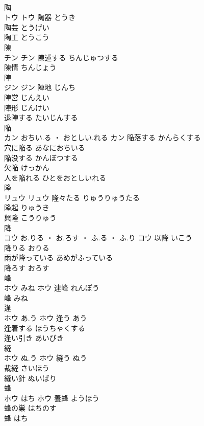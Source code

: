 \documentclass[8pt]{extreport}
\begin{document}
\begin{CJK}{UTF8}{min}
\\	陶	
\\	トウ		トウ	陶器	とうき	
\\	陶芸	とうげい	
\\	陶工	とうこう	
\\	陳	
\\	チン		チン	陳述する	ちんじゅつする	
\\	陳情	ちんじょう	
\\	陣	
\\	ジン		ジン	陣地	じんち	
\\	陣営	じんえい	
\\	陣形	じんけい	
\\	退陣する	たいじんする	
\\	陥	
\\	カン	おちい.る ・ おとしい.れる	カン	陥落する	かんらくする	
\\	穴に陥る	あなにおちいる	
\\	陥没する	かんぼつする	
\\	欠陥	けっかん	
\\	人を陥れる	ひとをおとしいれる	
\\	隆	
\\	リュウ		リュウ	隆々たる	りゅうりゅうたる	
\\	隆起	りゅうき	
\\	興隆	こうりゅう	
\\	降	
\\	コウ	お.りる ・ お.ろす ・ ふ.る ・ ふ.り	コウ	以降	いこう	
\\	降りる	おりる	
\\	雨が降っている	あめがふっている	
\\	降ろす	おろす	
\\	峰	
\\	ホウ	みね	ホウ	連峰	れんぽう	
\\	峰	みね	
\\	逢	
\\	ホウ	あ.う	ホウ	逢う	あう	
\\	逢着する	ほうちゃくする	
\\	逢い引き	あいびき	
\\	縫	
\\	ホウ	ぬ.う	ホウ	縫う	ぬう	
\\	裁縫	さいほう	
\\	縫い針	ぬいばり	
\\	蜂	
\\	ホウ	はち	ホウ													養蜂	ようほう	
\\	蜂の巣	はちのす	
\\	蜂	はち	

\end{CJK}
\end{document}
